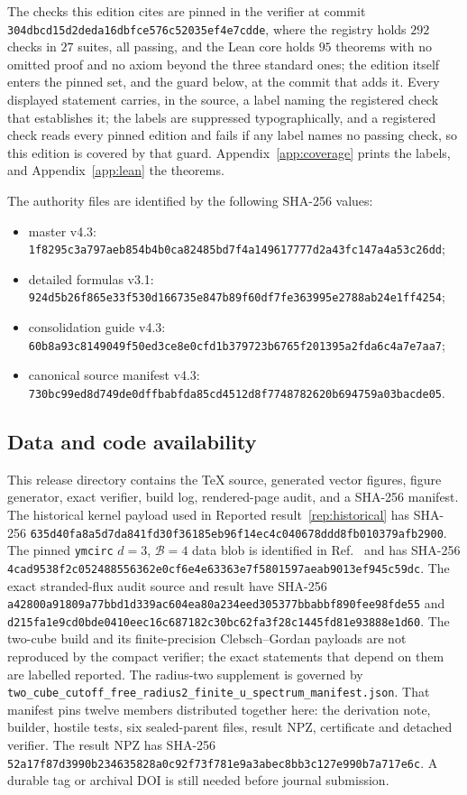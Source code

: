 \documentclass[11pt]{article}
\theoremstyle{plain}
\theoremstyle{definition}
\theoremstyle{remark}
\newcommand{\chk}[1]{}
\begin{document}
The checks this edition cites are pinned in the verifier at commit
\nolinkurl{304dbcd15d2deda16dbfce576c52035ef4e7cdde}, where the registry holds $292$ checks in $27$ suites,
all passing, and the Lean core holds $95$ theorems with no omitted proof and
no axiom beyond the three standard ones; the edition itself enters the pinned
set, and the guard below, at the commit that adds it. Every displayed
statement carries, in
the source, a \texttt{\string\chk} label naming the registered check that
establishes it; the labels are suppressed typographically, and a registered
check reads every pinned edition and fails if any label names no passing
check, so this edition is covered by that guard. Appendix~\ref{app:coverage}
prints the labels, and Appendix~\ref{app:lean} the theorems.

The authority files are identified by the following SHA-256 values:
\begin{itemize}
\item master v4.3:
  \nolinkurl{1f8295c3a797aeb854b4b0ca82485bd7f4a149617777d2a43fc147a4a53c26dd};
\item detailed formulas v3.1:
  \nolinkurl{924d5b26f865e33f530d166735e847b89f60df7fe363995e2788ab24e1ff4254};
\item consolidation guide v4.3:
  \nolinkurl{60b8a93c8149049f50ed3ce8e0cfd1b379723b6765f201395a2fda6c4a7e7aa7};
\item canonical source manifest v4.3:
  \nolinkurl{730bc99ed8d749de0dffbabfda85cd4512d8f7748782620b694759a03bacde05}.
\end{itemize}

\subsection{Data and code availability}

This release directory contains the TeX source, generated vector figures,
figure generator, exact verifier, build log, rendered-page audit, and a
SHA-256 manifest. The historical kernel payload used in
Reported result~\ref{rep:historical} has SHA-256
\nolinkurl{635d40fa8a5d7da841fd30f36185eb96f14ec4c040678ddd8fb010379afb2900}.
The pinned \texttt{ymcirc} $d=3$, $\mathcal B=4$ data blob is identified in
Ref.~\cite{ymcirc2026} and has SHA-256
\nolinkurl{4cad9538f2c052488556362e0cf6e4e63363e7f5801597aeab9013ef945c59dc}.
The exact stranded-flux audit source and result have SHA-256
\nolinkurl{a42800a91809a77bbd1d339ac604ea80a234eed305377bbabbf890fee98fde55}
and
\nolinkurl{d215fa1e9cd0bde0410eec16c687182c30bc62fa3f28c1445fd81e93888e1d60}.
The two-cube build and its finite-precision Clebsch--Gordan payloads are not
reproduced by the compact verifier; the exact statements that depend on them
are labelled reported. The radius-two supplement is governed by
\texttt{two\_cube\_cutoff\_free\_radius2\_finite\_u\_spectrum\_manifest.json}.
That manifest pins twelve members distributed together here: the derivation
note, builder, hostile tests, six sealed-parent files, result NPZ, certificate
and detached verifier. The result NPZ has SHA-256
\nolinkurl{52a17f87d3990b234635828a0c92f73f781e9a3abec8bb3c127e990b7a717e6c}.
A durable tag or archival DOI is still needed before journal submission.
\end{document}
